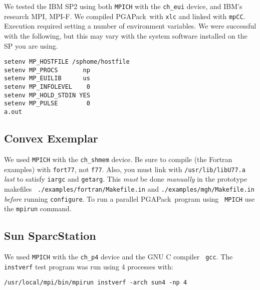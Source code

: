 \documentclass{report}
\newcommand{\pga}{PGAPack}
\begin{document}

We tested the IBM SP2 using both {\tt MPICH} with the {\tt ch\_eui} device,
and IBM's research MPI, MPI-F. We compiled \pga\ with {\tt xlc} and linked
with {\tt mpCC}.  Execution required setting a number of environment
variables.  We were successful with the following, but this may vary with the
system software installed on the SP you are using.

\begin{verbatim}
setenv MP_HOSTFILE /sphome/hostfile
setenv MP_PROCS       np
setenv MP_EUILIB      us
setenv MP_INFOLEVEL    0
setenv MP_HOLD_STDIN YES
setenv MP_PULSE        0
a.out
\end{verbatim}


\subsection*{Convex Exemplar}

We used {\tt MPICH} with the {\tt ch\_shmem} device.  Be sure to compile (the
Fortran examples) with {\tt fort77}, not {\tt f77}.  Also, you must link with
{\tt /usr/lib/libU77.a} {\em last} to satisfy {\tt iargc} and {\tt getarg}.
This {\em must} be done {\em manually} in the prototype makefiles {\tt
./examples/fortran/Makefile.in} and {\tt ./examples/mgh/Makefile.in} {\em
before} running {\tt configure}.  To run a parallel \pga\ program using {\tt
MPICH} use the {\tt mpirun} command.



\subsection*{Sun SparcStation}

We used {\tt MPICH} with the {\tt ch\_p4} device and the GNU C compiler {\tt
gcc}.  The {\tt instverf} test program was run using 4 processes with:
\begin{verbatim}
/usr/local/mpi/bin/mpirun instverf -arch sun4 -np 4
\end{verbatim}
\end{document}
